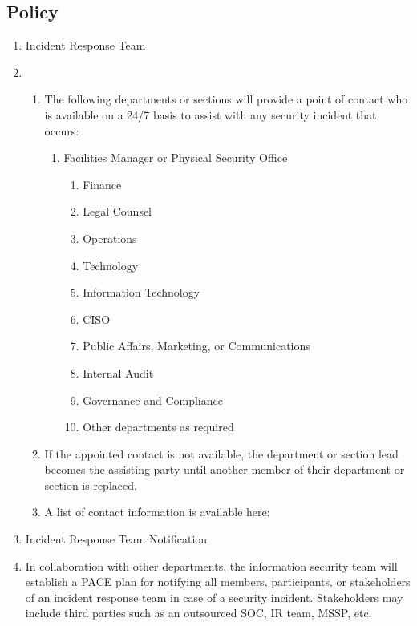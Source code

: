 \documentclass[../main.tex]{subfiles}
\begin{document}
\subsection{Policy}
\begin{enumerate}
    \item Incident Response Team
    \item \begin{enumerate}
        \item The following departments or sections will provide a point of contact who is available on a 24/7 basis to assist with any security incident that occurs:
        \begin{enumerate}
            \item Facilities Manager or Physical Security Office
            \begin{enumerate}
                \item Finance
                \item Legal Counsel
                \item Operations
                \item Technology
                \item Information Technology
                \item CISO
                \item Public Affairs, Marketing, or Communications
                \item Internal Audit
                \item Governance and Compliance
                \item Other departments as required
            \end{enumerate}
        \end{enumerate}
        \item If the appointed contact is not available, the department or section lead becomes the assisting party until another member of their department or section is replaced.
        \item A list of contact information is available here: \IRTStakeholders
    \end{enumerate}
    \item Incident Response Team Notification
    \item In collaboration with other departments, the information security team will establish a PACE plan for notifying all members, participants, or stakeholders of an incident response team
    in case of a security incident. Stakeholders may include third parties such as an outsourced SOC, IR team, MSSP, etc.

\end{enumerate}
\end{document}
